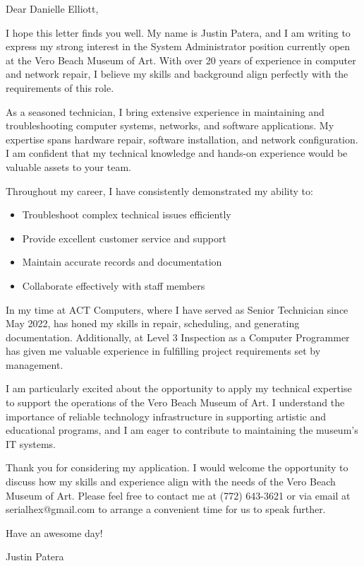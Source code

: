 
Dear Danielle Elliott,

\smallskip

I hope this letter finds you well.
My name is Justin Patera, and I am writing to express my strong interest in the System Administrator position currently open at the Vero Beach Museum of Art.
With over 20 years of experience in computer and network repair, I believe my skills and background align perfectly with the requirements of this role.

\smallskip

As a seasoned technician, I bring extensive experience in maintaining and troubleshooting computer systems, networks, and software applications.
My expertise spans hardware repair, software installation, and network configuration.
I am confident that my technical knowledge and hands-on experience would be valuable assets to your team.

\smallskip

Throughout my career, I have consistently demonstrated my ability to:

\begin{itemize}
  \item Troubleshoot complex technical issues efficiently
  \item Provide excellent customer service and support
  \item Maintain accurate records and documentation
  \item Collaborate effectively with staff members
\end{itemize}

\smallskip

In my time at ACT Computers, where I have served as Senior Technician since May 2022, has honed my skills in repair, scheduling, and generating documentation.
Additionally, at Level 3 Inspection as a Computer Programmer has given me valuable experience in fulfilling project requirements set by management.

\smallskip

I am particularly excited about the opportunity to apply my technical expertise to support the operations of the Vero Beach Museum of Art.
I understand the importance of reliable technology infrastructure in supporting artistic and educational programs, and I am eager to contribute to maintaining the museum's IT systems.

\smallskip

Thank you for considering my application.
I would welcome the opportunity to discuss how my skills and experience align with the needs of the Vero Beach Museum of Art.
Please feel free to contact me at (772) 643-3621 or via email at serialhex@gmail.com to arrange a convenient time for us to speak further.

\smallskip

Have an awesome day!

Justin Patera

